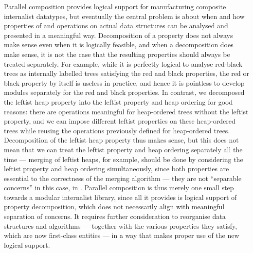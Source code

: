 Parallel composition provides logical support for manufacturing composite internalist datatypes, but eventually the central problem is about when and how properties of and operations on actual data structures can be analysed and presented in a meaningful way.
Decomposition of a property does not always make sense even when it is logically feasible, and when a decomposition does make sense, it is not the case that the resulting properties should always be treated separately.
For example, while it is perfectly logical to analyse red-black trees as internally labelled trees satisfying the red and black properties, the red or black property by itself is useless in practice, and hence it is pointless to develop modules separately for the red and black properties.
In contrast, we decomposed the leftist heap property into the leftist property and heap ordering for good reasons: there are operations meaningful for heap-ordered trees without the leftist property, and we can impose different leftist properties on these heap-ordered trees while reusing the operations previously defined for heap-ordered trees.
Decomposition of the leftist heap property thus makes sense, but this does not mean that we can treat the leftist property and heap ordering separately all the time --- merging of leftist heaps, for example, should be done by considering the leftist property and heap ordering simultaneously, since both properties are essential to the correctness of the merging algorithm --- they are not ``separable concerns'' in this case, in .
Parallel composition is thus merely one small step towards a modular internalist library, since all it provides is logical support of property decomposition, which does not necessarily align with meaningful separation of concerns.
It requires further consideration to reorganise data structures and algorithms --- together with the various properties they satisfy, which are now first-class entities --- in a way that makes proper use of the new logical support.